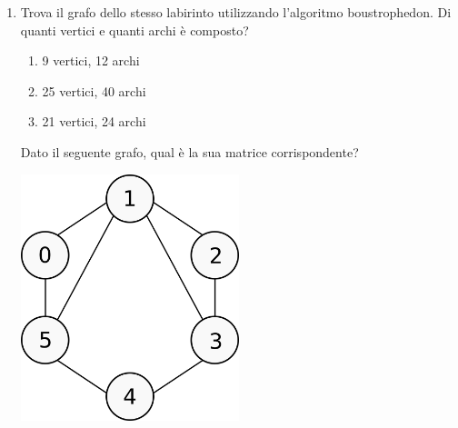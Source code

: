\documentclass[8pt]{book}
\begin{document}
\begin{enumerate}
\item Trova il grafo dello stesso labirinto utilizzando l'algoritmo boustrophedon. Di quanti vertici e quanti archi è composto?

\begin{enumerate}
\def\labelenumi{\alph{enumi}.}

\item
  9 vertici, 12 archi
\item
  25 vertici, 40 archi
\item
  21 vertici, 24 archi
\end{enumerate}

Dato il seguente grafo, qual è la sua matrice corrispondente?

\includegraphics[width=0.50000\textwidth]{img/matriceGrafo_es.png}\\[2\baselineskip]

\begin{enumerate}
\def\labelenumi{\alph{enumi}.}


\end{enumerate}
\end{enumerate}
\end{document}
